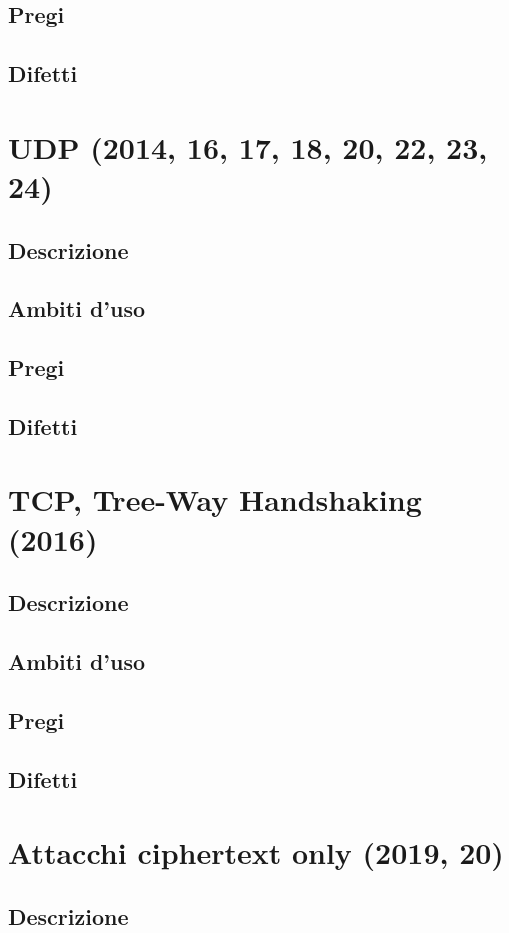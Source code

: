 \documentclass[10pt,oneside,a4paper]{article}
\begin{document}
\subsection{Pregi}
\subsection{Difetti}
\section{UDP (2014, 16, 17, 18, 20, 22, 23, 24)}
\subsection{Descrizione}
\subsection{Ambiti d'uso}
\subsection{Pregi}
\subsection{Difetti}
\section{TCP, Tree-Way Handshaking (2016)}
\subsection{Descrizione}
\subsection{Ambiti d'uso}
\subsection{Pregi}
\subsection{Difetti}
\section{Attacchi ciphertext only (2019, 20)}
\subsection{Descrizione}
\end{document}
